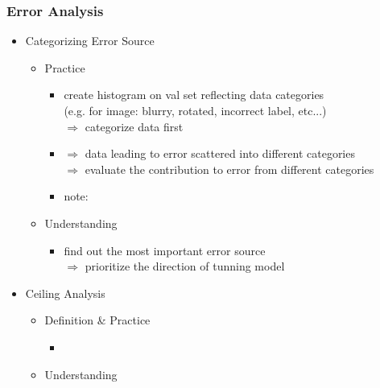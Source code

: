 \subsubsection{Error Analysis}
\begin{itemize}
\item Categorizing Error Source
	\begin{itemize}
	\item Practice
		\begin{itemize}
		\item create histogram on val set reflecting data categories \\
		(e.g. for image: blurry, rotated, incorrect label, etc...) \\
		$\Rightarrow$ categorize data first
		\item $\Rightarrow$ data leading to error scattered into different categories \\
		$\Rightarrow$ evaluate the contribution to error from different categories
		\item note: 
		\end{itemize}
	\item Understanding
		\begin{itemize}
		\item find out the most important error source \\
		$\Rightarrow$ prioritize the direction of tunning model
		\end{itemize}
	\end{itemize}
	
\item Ceiling Analysis
	\begin{itemize}
	\item Definition \& Practice
		\begin{itemize}
		\item
		\end{itemize}
	\item Understanding
	\end{itemize}
\end{itemize}

